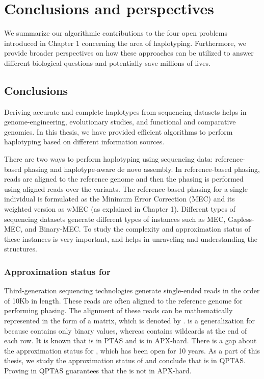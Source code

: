 \chapter{Conclusions and perspectives}
We summarize our algorithmic contributions to the four open problems introduced in Chapter 1 concerning the area of haplotyping.
Furthermore, we provide broader perspectives on how these approaches can be utilized to answer different biological questions and potentially save millions of lives.

\section{Conclusions}
Deriving accurate and complete haplotypes from sequencing datasets helps in genome-engineering, evolutionary studies, and functional and comparative genomics.
In this thesis, we have provided efficient algorithms to perform haplotyping based on different information sources.

There are two ways to perform haplotyping using sequencing data: reference-based phasing and haplotype-aware de novo assembly.
In reference-based phasing, reads are aligned to the reference genome and then the phasing is performed using aligned reads over the variants.
The reference-based phasing for a single individual is formulated as the Minimum Error Correction (MEC) and its weighted version as wMEC (as explained in Chapter 1).
Different types of sequencing datasets generate different types of instances such as MEC, Gapless-MEC, and Binary-MEC.
To study the complexity and approximation status of these instances is very important, and helps in unraveling and understanding the structures.

\subsection{Approximation status for \GMEC}
Third-generation sequencing technologies generate single-ended reads in the order of 10Kb in length. These reads are often aligned to the reference genome for performing phasing.
The alignment of these reads can be mathematically represented in the form of a matrix, which is denoted by \GMEC.
\GMEC is a generalization for \BMEC because \BMEC contains only binary values, whereas \GMEC contains wildcards at the end of each row. 
It is known that \BMEC is in PTAS and \MEC is in APX-hard.
There is a gap about the approximation status for \GMEC, which has been open for 10 years.  
As a part of this thesis, we study the approximation status of \GMEC and conclude that \GMEC is in QPTAS.
Proving \GMEC in QPTAS guarantees that the \GMEC is not in APX-hard.

